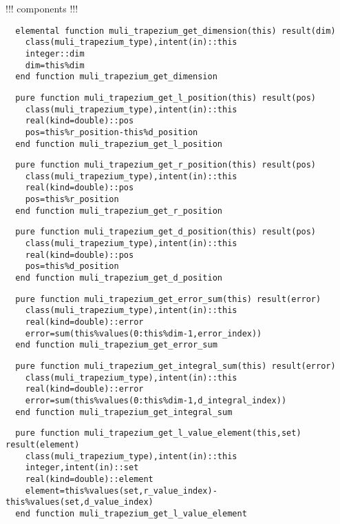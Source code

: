 !!! components !!!

\begin{Verbatim}
  elemental function muli_trapezium_get_dimension(this) result(dim)
    class(muli_trapezium_type),intent(in)::this
    integer::dim
    dim=this%dim
  end function muli_trapezium_get_dimension
\end{Verbatim}

\begin{Verbatim}
  pure function muli_trapezium_get_l_position(this) result(pos)
    class(muli_trapezium_type),intent(in)::this
    real(kind=double)::pos
    pos=this%r_position-this%d_position
  end function muli_trapezium_get_l_position
\end{Verbatim}

\begin{Verbatim}
  pure function muli_trapezium_get_r_position(this) result(pos)
    class(muli_trapezium_type),intent(in)::this
    real(kind=double)::pos
    pos=this%r_position
  end function muli_trapezium_get_r_position
\end{Verbatim}

\begin{Verbatim}
  pure function muli_trapezium_get_d_position(this) result(pos)
    class(muli_trapezium_type),intent(in)::this
    real(kind=double)::pos
    pos=this%d_position
  end function muli_trapezium_get_d_position
\end{Verbatim}

\begin{Verbatim}
  pure function muli_trapezium_get_error_sum(this) result(error)
    class(muli_trapezium_type),intent(in)::this
    real(kind=double)::error
    error=sum(this%values(0:this%dim-1,error_index))
  end function muli_trapezium_get_error_sum
\end{Verbatim}

\begin{Verbatim}
  pure function muli_trapezium_get_integral_sum(this) result(error)
    class(muli_trapezium_type),intent(in)::this
    real(kind=double)::error
    error=sum(this%values(0:this%dim-1,d_integral_index))
  end function muli_trapezium_get_integral_sum
\end{Verbatim}

\begin{Verbatim}
  pure function muli_trapezium_get_l_value_element(this,set) result(element)
    class(muli_trapezium_type),intent(in)::this
    integer,intent(in)::set
    real(kind=double)::element
    element=this%values(set,r_value_index)-this%values(set,d_value_index)
  end function muli_trapezium_get_l_value_element
\end{Verbatim}

